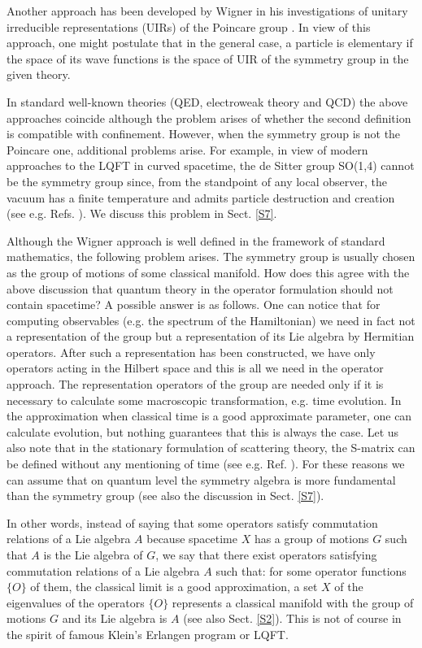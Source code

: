 \documentclass[a4paper,12pt]{article}%
\begin{document}
Another approach has been developed by Wigner in his 
investigations of unitary irreducible representations 
(UIRs) of the Poincare group \cite{Wigner}. In view 
of this approach, one might postulate that in the 
general case, a particle is elementary if the space 
of its wave functions is the space of UIR of the 
symmetry group in the given theory.

In standard well-known theories (QED, electroweak 
theory and QCD) the above approaches coincide 
although the problem arises of whether the second 
definition is compatible with confinement. However, 
when the symmetry group is not the Poincare one, 
additional problems arise. For example, in view of 
modern approaches to the LQFT in curved spacetime, 
the de Sitter group SO(1,4) cannot be the symmetry 
group since, from the standpoint of any local 
observer, the vacuum has a finite temperature and 
admits particle destruction and creation (see e.g. 
Refs. \cite{Narlikar,Susskind}). We discuss this problem 
in Sect. \ref{S7}.   

Although the Wigner approach is well defined in the 
framework of standard mathematics,
the following problem arises. The symmetry group is 
usually chosen as the group of motions of some classical 
manifold. How does this agree with the above discussion 
that quantum theory in the operator formulation should 
not contain spacetime? A possible answer is as follows. 
One can notice that for computing observables (e.g. the
spectrum of the Hamiltonian) we need in fact not a 
representation of the group but a representation of its 
Lie algebra by Hermitian operators. After such a 
representation has been constructed, we have only 
operators acting in the Hilbert space and this is all 
we need in the operator approach. The representation 
operators of the group are needed only if it is 
necessary to calculate some macroscopic 
transformation, e.g. time evolution. In the approximation 
when classical time is a good approximate parameter, 
one can calculate evolution, but nothing guarantees 
that this is always the case. Let us also note that in
the stationary formulation of scattering theory, the
S-matrix can be defined without any mentioning of
time (see e.g. Ref. \cite{Kato}). For these reasons 
we can assume that on quantum level the symmetry 
algebra is more fundamental than the symmetry group
(see also the discussion in Sect. \ref{S7}). 

In other words, instead of saying that some operators 
satisfy commutation relations of a Lie algebra 
$A$ because spacetime $X$ has a group of motions $G$ such 
that $A$ is the Lie algebra of $G$, we say that there
exist operators satisfying  commutation 
relations of a Lie algebra $A$ such that: for some 
operator functions $\{O\}$ of them, the classical 
limit is a good approximation, a set $X$ of the eigenvalues
of the operators $\{O\}$ represents a classical manifold with 
the group of motions $G$ and its Lie algebra is $A$ (see also Sect. 
\ref{S2}). This is not of course in the spirit of 
famous Klein's Erlangen program \cite{Klein} or LQFT.
\end{document}
